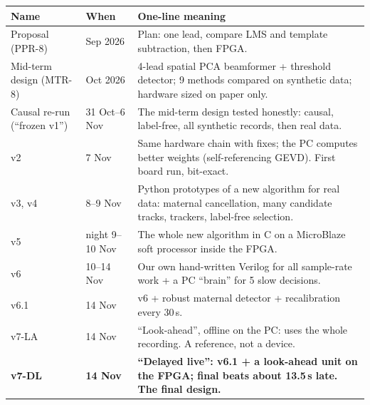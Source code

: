 \documentclass[11pt]{article}
\begin{document}
\begin{center}
\small
\begin{tabularx}{\linewidth}{@{}l l X@{}}
\toprule
\textbf{Name} & \textbf{When} & \textbf{One-line meaning} \\
\midrule
Proposal (PPR-8) & Sep 2026 & Plan: one lead, compare LMS and template subtraction, then FPGA. \\
Mid-term design (MTR-8) & Oct 2026 & 4-lead spatial PCA beamformer + threshold detector; 9 methods compared on synthetic data; hardware sized on paper only. \\
Causal re-run (``frozen v1'') & 31 Oct--6 Nov & The mid-term design tested honestly: causal, label-free, all synthetic records, then real data. \\
v2 & 7 Nov & Same hardware chain with fixes; the PC computes better weights (self-referencing GEVD). First board run, bit-exact. \\
v3, v4 & 8--9 Nov & Python prototypes of a new algorithm for real data: maternal cancellation, many candidate tracks, trackers, label-free selection. \\
v5 & night 9--10 Nov & The whole new algorithm in C on a MicroBlaze soft processor inside the FPGA. \\
v6 & 10--14 Nov & Our own hand-written Verilog for all sample-rate work + a PC ``brain'' for 5 slow decisions. \\
v6.1 & 14 Nov & v6 + robust maternal detector + recalibration every 30\,s. \\
v7-LA & 14 Nov & ``Look-ahead'', offline on the PC: uses the whole recording. A reference, not a device. \\
\textbf{v7-DL} & \textbf{14 Nov} & \textbf{``Delayed live'': v6.1 + a look-ahead unit on the FPGA; final beats about 13.5\,s late. The final design.} \\
\bottomrule
\end{tabularx}
\end{center}
\end{document}
